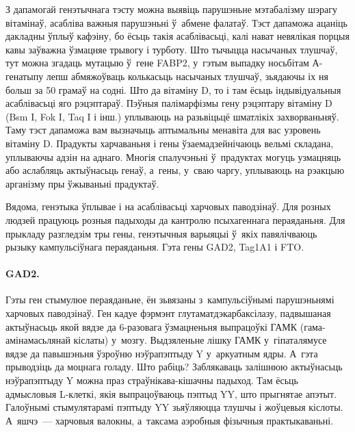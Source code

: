 З дапамогай генэтычнага тэсту можна выявіць парушэньне мэтабалізму шэрагу вітамінаў, асабліва важныя парушэньні ў~абмене фалатаў. Тэст дапаможа ацаніць дакладны ўплыў кафэіну, бо ёсьць такія асаблівасьці, калі нават невялікая порцыя кавы заўважна ўзмацняе трывогу і турботу. Што тычыцца насычаных тлушчаў, тут можна згадаць мутацыю ў~гене FABP2, у~гэтым выпадку носьбітам А-генатыпу лепш абмяжоўваць колькасьць насычаных тлушчаў, зьядаючы іх ня больш за 50 грамаў на содні. Што да вітаміну D, то і там ёсьць індывідуальныя асаблівасьці яго рэцэптараў. Пэўныя палімарфізмы гену рэцэптару вітаміну D (Bsm I, Fok I, Taq I і інш.) уплываюць на разьвіцьцё шматлікіх захворваньняў. Таму тэст дапаможа вам вызначыць аптымальны менавіта для вас узровень вітаміну D. Прадукты харчаваньня і гены ўзаемадзейнічаюць вельмі складана, уплываючы адзін на аднаго. Многія спалучэньні ў~прадуктах могуць узмацняць або аслабляць актыўнасьць генаў, а~гены, у~сваю чаргу, уплываюць на рэакцыю арганізму пры ўжываньні прадуктаў.

Вядома, генэтыка ўплывае і на асаблівасьці харчовых паводзінаў. Для розных людзей працуюць розныя падыходы да кантролю псыхагеннага пераяданьня. Для прыкладу разгледзім тры гены, генэтычныя варыяцыі ў~якіх павялічваюць рызыку кампульсіўнага пераяданьня. Гэта гены GAD2, Tag1A1 і FTO.

\paragraph{GAD2.}
Гэты ген стымулюе пераяданьне, ён зьвязаны з~кампульсіўнымі парушэньнямі харчовых паводзінаў. Ген кадуе фэрмэнт глутаматдэкарбаксілазу, падвышаная актыўнасьць якой вядзе да 6-разовага ўзмацненьня выпрацоўкі ГАМК (гама-амінамасьлянай кіслаты) у~мозгу. Выдзяленьне лішку ГАМК у~гіпаталямусе вядзе да павышэньня ўзроўню нэўрапэптыду Y у~аркуатным ядры. А~гэта прыводзіць да моцнага голаду. Што рабіць? Заблякаваць залішнюю актыўнасьць нэўрапэптыду Y можна праз страўнікава-кішачны падыход. Там ёсьць адмысловыя L-клеткі, якія выпрацоўваюць пэптыд YY, што прыгнятае апэтыт. Галоўнымі стымулятарамі пэптыду YY зьяўляюцца тлушчы і жоўцевыя кіслоты. А~яшчэ~--- харчовыя валокны, а~таксама аэробныя фізычныя практыкаваньні.

